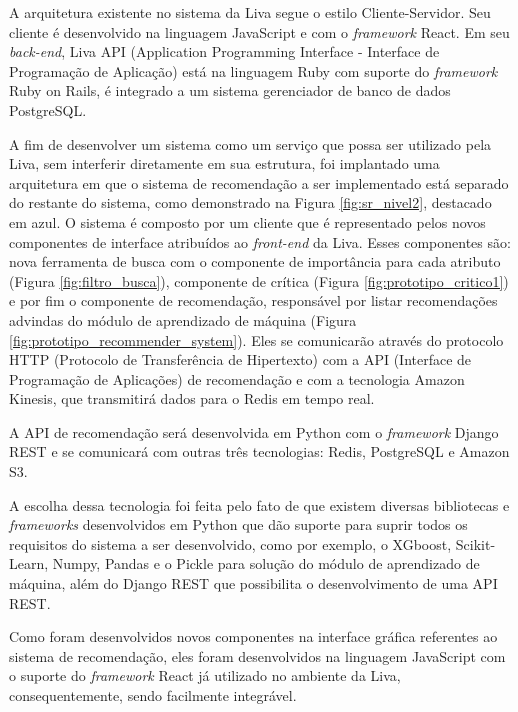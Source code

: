 A arquitetura existente no sistema da Liva segue o estilo Cliente-Servidor. Seu cliente é desenvolvido na linguagem JavaScript e com o \textit{framework} React. Em seu \textit{back-end}, Liva API (Application Programming Interface - Interface de Programação de Aplicação) está na linguagem Ruby com suporte do \textit{framework} Ruby on Rails, é integrado a um sistema gerenciador de banco de dados PostgreSQL.

A fim de desenvolver um sistema como um serviço que possa ser utilizado pela Liva, sem interferir diretamente em sua estrutura, foi implantado uma arquitetura em que o sistema de recomendação a ser implementado está separado do restante do sistema, como demonstrado na Figura \ref{fig:sr_nivel2}, destacado em azul. O sistema é composto por um cliente que é representado pelos novos componentes de interface atribuídos ao \textit{front-end} da Liva. Esses componentes são: nova ferramenta de busca com o componente de importância para cada atributo (Figura \ref{fig:filtro_busca}), componente de crítica (Figura \ref{fig:prototipo_critico1}) e por fim o componente de recomendação, responsável por listar recomendações advindas do módulo de aprendizado de máquina (Figura \ref{fig:prototipo_recommender_system}). Eles se comunicarão através do protocolo HTTP (Protocolo de Transferência de Hipertexto) com a API (Interface de Programação de Aplicações) de recomendação e com a tecnologia Amazon Kinesis, que transmitirá dados para o Redis em tempo real.

A API de recomendação será desenvolvida em Python com o \textit{framework} Django REST e se comunicará com outras três tecnologias: Redis, PostgreSQL e Amazon S3. 

A escolha dessa tecnologia foi feita pelo fato de que existem diversas bibliotecas e \textit{frameworks} desenvolvidos em Python que dão suporte para suprir todos os requisitos do sistema a ser desenvolvido, como por exemplo, o XGboost, Scikit-Learn, Numpy, Pandas e o Pickle para solução do módulo de aprendizado de máquina, além do Django REST que possibilita o desenvolvimento de uma API REST.

Como foram desenvolvidos novos componentes na interface gráfica referentes ao sistema de recomendação, eles foram desenvolvidos na linguagem JavaScript com o suporte do \textit{framework} React já utilizado no ambiente da Liva, consequentemente, sendo facilmente integrável.

